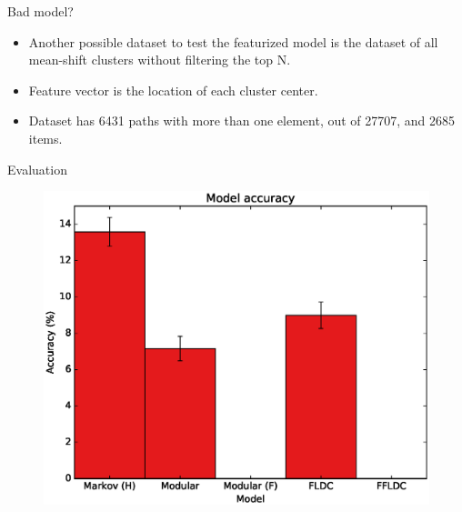 \documentclass{beamer}
\begin{document}
\begin{frame}{Bad model?}
  \begin{itemize}
    \item Another possible dataset to test the featurized model is the dataset of all mean-shift clusters without filtering the top N.
    \item Feature vector is the location of each cluster center.
    \item Dataset has 6431 paths with more than one element, out of 27707, and 2685 items.
  \end{itemize}
\end{frame}

\begin{frame}{Evaluation}
  \begin{figure}
    \centering
    \includegraphics[height=0.8\textheight]{score_all}
  \end{figure}
\end{frame}


%  
%  
\end{document}
